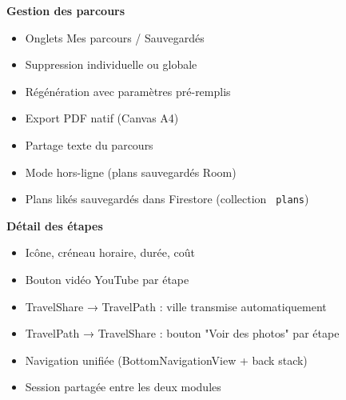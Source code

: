 \documentclass[a4paper,12pt,openany]{report}
\newcommand{\ic}[1]{\texttt{\small\colorbox{lightbg}{\color{navy!90} #1}}}
\begin{document}
\begin{tcolorbox}
\begin{multicols}{2}
\textbf{Gestion des parcours}
\begin{itemize}[leftmargin=*,itemsep=0pt,topsep=2pt]
  \item Onglets Mes parcours / Sauvegardés
  \item Suppression individuelle ou globale
  \item Régénération avec paramètres pré-remplis
  \item Export PDF natif (Canvas A4)
  \item Partage texte du parcours
  \item Mode hors-ligne (plans sauvegardés Room)
  \item Plans likés sauvegardés dans Firestore (collection \ic{plans})
\end{itemize}

\textbf{Détail des étapes}
\begin{itemize}[leftmargin=*,itemsep=0pt,topsep=2pt]
  \item Icône, créneau horaire, durée, coût
  \item Bouton vidéo YouTube par étape
\end{itemize}
\end{multicols}
\end{tcolorbox}

\vspace{8pt}

\begin{tcolorbox}[enhanced, colback=okbg, colframe=greentxt, arc=4pt,
  boxrule=0.6pt, left=8pt, right=8pt, top=6pt, bottom=6pt,
  title={\textbf{Passerelle — Intégration bidirectionnelle}},
  fonttitle=\bfseries\small\color{white},
  colbacktitle=greentxt]
\small
\begin{multicols}{2}
\begin{itemize}[leftmargin=*,itemsep=0pt,topsep=2pt]
  \item TravelShare → TravelPath : ville transmise automatiquement
  \item TravelPath → TravelShare : bouton "Voir des photos" par étape
\end{itemize}
\columnbreak
\begin{itemize}[leftmargin=*,itemsep=0pt,topsep=2pt]
  \item Navigation unifiée (BottomNavigationView + back stack)
  \item Session partagée entre les deux modules
\end{itemize}
\end{multicols}
\end{tcolorbox}
\end{document}
